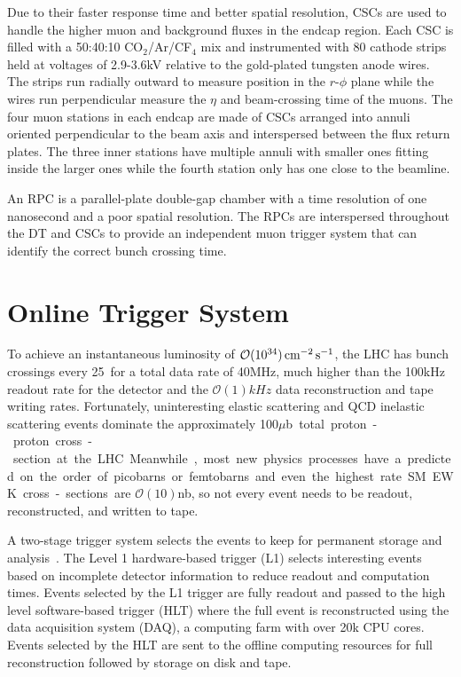 Due to their faster response time and better spatial resolution, CSCs are used to handle the higher muon and background fluxes in the endcap region. 
Each CSC is filled with a 50:40:10 CO$_2$/Ar/CF$_4$ mix and instrumented with 80 cathode strips held at voltages of 2.9-3.6\unit{kV} relative to the gold-plated tungsten anode wires.
The strips run radially outward to measure position in the $r$-$\phi$ plane while the wires run perpendicular measure the $\eta$ and beam-crossing time of the muons.
The four muon stations in each endcap are made of CSCs arranged into annuli oriented perpendicular to the beam axis and interspersed between the flux return plates.
The three inner stations have multiple annuli with smaller ones fitting inside the larger ones while the fourth station only has one close to the beamline.

An RPC is a parallel-plate double-gap chamber with a time resolution of one nanosecond and a poor spatial resolution. 
The RPCs are interspersed throughout the DT and CSCs to provide an independent muon trigger system that can identify the correct bunch crossing time.

\section{Online Trigger System}

To achieve an instantaneous luminosity of $\mathcal{O}(10^{34}) \,\text{cm}^{-2}\,\text{s}^{-1}$, the LHC has bunch crossings every 25\ns\ for a total data rate of 40\unit{MHz}, much higher than the 100\unit{kHz} readout rate for the detector and the $\mathcal{O}(1)\unit{kHz}$ data reconstruction and tape writing rates.
Fortunately, uninteresting elastic scattering and QCD inelastic scattering events dominate the approximately 100\unit{$\mu$b} total proton-proton cross-section at the LHC.
Meanwhile, most new physics processes have a predicted on the order of picobarns or femtobarns and even the highest rate SM EWK cross-sections are $\mathcal{O}(10)$\unit{nb}, so not every event needs to be readout, reconstructed, and written to tape.

A two-stage trigger system selects the events to keep for permanent storage and analysis~\cite{CMS2008}.
The Level 1 hardware-based trigger (L1) selects interesting events based on incomplete detector information to reduce readout and computation times.
Events selected by the L1 trigger are fully readout and passed to the high level software-based trigger (HLT) where the full event is reconstructed using the data acquisition system (DAQ), a computing farm with over 20k CPU cores.
Events selected by the HLT are sent to the offline computing resources for full reconstruction followed by storage on disk and tape. 

